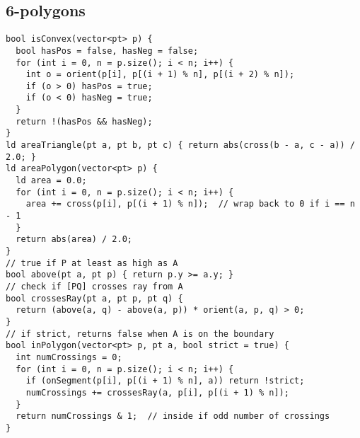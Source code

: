 \documentclass[twoside]{article}
\begin{document}
\begin{multicols*}{2}
{\subsection*{6-polygons}
}
\begin{verbatim}
bool isConvex(vector<pt> p) {
  bool hasPos = false, hasNeg = false;
  for (int i = 0, n = p.size(); i < n; i++) {
    int o = orient(p[i], p[(i + 1) % n], p[(i + 2) % n]);
    if (o > 0) hasPos = true;
    if (o < 0) hasNeg = true;
  }
  return !(hasPos && hasNeg);
}
ld areaTriangle(pt a, pt b, pt c) { return abs(cross(b - a, c - a)) / 2.0; }
ld areaPolygon(vector<pt> p) {
  ld area = 0.0;
  for (int i = 0, n = p.size(); i < n; i++) {
    area += cross(p[i], p[(i + 1) % n]);  // wrap back to 0 if i == n - 1
  }
  return abs(area) / 2.0;
}
// true if P at least as high as A
bool above(pt a, pt p) { return p.y >= a.y; }
// check if [PQ] crosses ray from A
bool crossesRay(pt a, pt p, pt q) {
  return (above(a, q) - above(a, p)) * orient(a, p, q) > 0;
}
// if strict, returns false when A is on the boundary
bool inPolygon(vector<pt> p, pt a, bool strict = true) {
  int numCrossings = 0;
  for (int i = 0, n = p.size(); i < n; i++) {
    if (onSegment(p[i], p[(i + 1) % n], a)) return !strict;
    numCrossings += crossesRay(a, p[i], p[(i + 1) % n]);
  }
  return numCrossings & 1;  // inside if odd number of crossings
}

\end{verbatim}

{
}
\end{multicols*}
\end{document}
